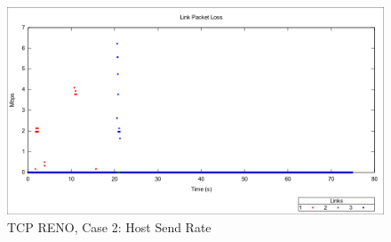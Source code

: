 \begin{figure}[htbp]
    \centering
    \includegraphics[width=\textwidth]{reno2/Link_Packet_Loss.png}
    \caption{TCP RENO, Case 2: Host Send Rate}
\end{figure}

\newpage
\clearpage

